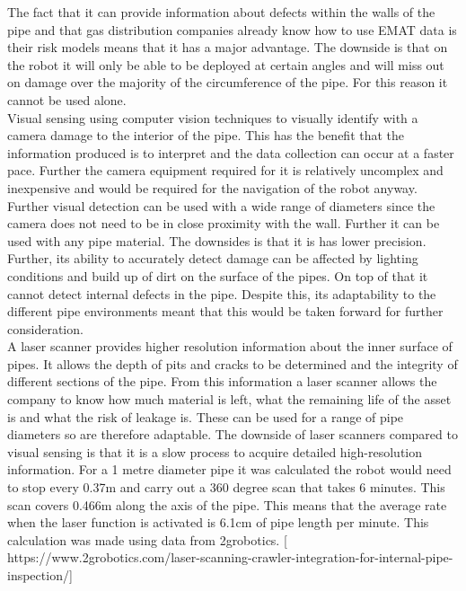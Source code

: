 \documentclass[11pt]{article}		%
\begin{document}
        The fact that it can provide information about defects within the walls of the pipe and that gas distribution companies already know how to use EMAT data is their risk models means that it has a major advantage. 
        The downside is that on the robot it will only be able to be deployed at certain angles and will miss out on damage over the majority of the circumference of the pipe. 
        For this reason it  cannot be used alone.
		\\
        Visual sensing using computer vision techniques to visually identify with a camera damage to the interior of the pipe. 
        This has the benefit that the information produced is to interpret and the data collection can occur at a faster pace. %
        Further the camera equipment required for it is relatively uncomplex and inexpensive and would be required for the navigation of the robot anyway. 
        Further visual detection can be used with a wide range of diameters since the camera does not need to be in close proximity with the wall. 
        Further it can be used with any pipe material. 
        The downsides is that it is has lower precision. Further, its ability to accurately detect damage can be affected by lighting conditions and build up of dirt on the surface of the pipes. 
        On top of that it cannot detect internal defects in the pipe. %
        Despite this, its adaptability to the different pipe environments meant that this would be taken forward for further consideration.
        \\
        A laser scanner provides higher resolution information about the inner surface of pipes. %
        It allows the depth of pits and cracks to be determined and the integrity of different sections of the pipe. 
        From this information a laser scanner allows the company to know how much material is left, what the remaining life of the asset is and what the risk of leakage is.  
        These can be used for a range of pipe diameters so are therefore adaptable. The downside of laser scanners compared to visual sensing is that it is a slow process to acquire detailed high-resolution information. 
        For a 1 metre diameter pipe it was calculated the robot would need to stop every 0.37m and carry out a 360 degree scan that takes 6 minutes. 
        This scan covers 0.466m along the axis of the pipe. 
        This means that the average rate when the laser function is activated is 6.1cm of pipe length per minute. 
        This calculation was made using data from 2grobotics. [  https://www.2grobotics.com/laser-scanning-crawler-integration-for-internal-pipe-inspection/]
\end{document}

